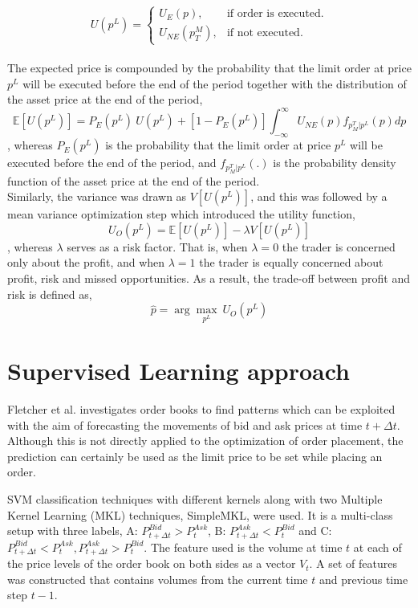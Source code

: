 \begin{equation}
    U(p^L) = \begin{cases}
                U_E(p), & \text{if order is executed}.\\
                U_{NE}(p_T^M), & \text{if not executed}.
             \end{cases}
\end{equation}
\hfill
\\
The expected price is compounded by the probability that the limit order at price $p^L$ will be executed before the end of the period together with the distribution of the asset price at the end of the period,
\begin{equation}
    \mathbb{E}[U(p^L)] = P_E(p^L)\ U(p^L) + [1-P_E(p^L)] \int_{-\infty}^{\infty} U_{NE}(p) f_{p_M^T | p^L}(p) dp
\end{equation}
, whereas $P_E(p^L)$ is the probability that the limit order at price $p^L$ will be executed before the end of the period, and $f_{p_M^T | p^L}(.)$ is the probability density function of the asset price at the end of the period. 
\\
Similarly, the variance was drawn as $V[U(p^L)]$, and this was followed by a mean variance optimization step which introduced the utility function,
\begin{equation}
    U_O(p^L) = \mathbb{E}[U(p^L)] - \lambda V[U(p^L)]
\end{equation}
, whereas $\lambda$ serves as a risk factor.
That is, when $\lambda=0$ the trader is concerned only about the profit, and when $\lambda=1$ the trader is equally concerned about profit, risk and missed opportunities.
As a result, the trade-off between profit and risk is defined as,
\begin{equation}
    \hat{p} = \arg\max_{p^L}\ U_O(p^L)
\end{equation}


\section{Supervised Learning approach}

Fletcher et al. \cite{fletcher2010multiple} investigates order books to find patterns which can be exploited with the aim of forecasting the movements of bid and ask prices at time $t+\Delta{t}$.
Although this is not directly applied to the optimization of order placement, the prediction can certainly be used as the limit price to be set while placing an order.

SVM classification techniques with different kernels along with two Multiple Kernel Learning (MKL) techniques, SimpleMKL, were used.
It is a multi-class setup with three labels, A: $P_{t+\Delta{t}}^{Bid} > P_t^{Ask}$, B: $P_{t+\Delta{t}}^{Ask} < P_t^{Bid}$ and C: $P_{t+\Delta{t}}^{Bid} < P_t^{Ask}, P_{t+\Delta{t}}^{Ask} > P_t^{Bid}$.
The feature used is the volume at time $t$ at each of the price levels of the order book on both sides as a vector $V_t$.
A set of features was constructed that contains volumes from the current time $t$ and previous time step $t-1$.

